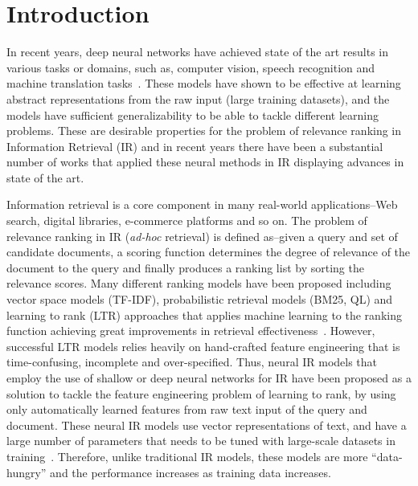 
\chapter{Introduction} %

\label{Chapter1} %



In recent years, deep neural networks have achieved state of the art results in various tasks or domains, such as, computer vision, speech recognition and machine translation tasks~\citep{lecun2015deep}. These models have shown to be effective at learning abstract representations from the raw input (large training datasets), and the models have sufficient generalizability to be able to tackle different learning problems. These are desirable properties for the problem of relevance ranking in Information Retrieval (IR) and in recent years there have been a substantial number of works that applied these neural methods in IR displaying advances in state of the art.

Information retrieval is a core component in many real-world applications--Web search, digital libraries, e-commerce platforms and so on. The problem of relevance ranking in IR (\textit{ad-hoc} retrieval) is defined as--given a query and set of candidate documents, a scoring function determines the degree of relevance of the document to the query and finally produces a ranking list by sorting the relevance scores. Many different ranking models have been proposed including vector space models (TF-IDF), probabilistic retrieval models (BM25, QL) and learning to rank (LTR) approaches that applies machine learning to the ranking function achieving great improvements in retrieval effectiveness~\citep{liu2009learning}. However, successful LTR models relies heavily on hand-crafted feature engineering that is time-confusing, incomplete and over-specified. Thus, neural IR models that employ the use of shallow or deep neural networks for IR have been proposed as a solution to tackle the feature engineering problem of learning to rank, by using only automatically learned features from raw text input of the query and document. These neural IR models use vector representations of text, and have a large number of parameters that needs to be tuned with large-scale datasets in training~\citep{Mitra2017a}. Therefore, unlike traditional IR models, these models are more ``data-hungry'' and the performance increases as training data increases.


